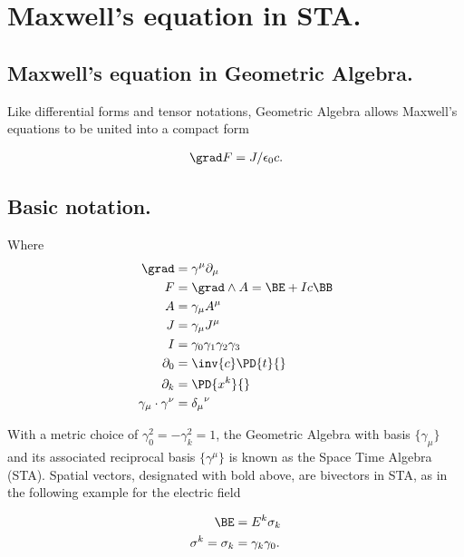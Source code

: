 
%

\chapter{Maxwell's equation in STA.}
\label{chap:maxwellsFromGA}
\date{Nov 8, 2010}

\beginArtWithToc

\section{Maxwell's equation in Geometric Algebra.}

Like differential forms and tensor notations, Geometric Algebra allows Maxwell's equations to be united into a compact form

\begin{align}\label{eqn:maxwellsFromGA:10}
\grad F = J/\epsilon_0 c.
\end{align}

\section{Basic notation.}
Where 
\begin{align}\label{eqn:maxwellsFromGA:11}
\grad &= \gamma^\mu \partial_\mu \\
F &= \grad \wedge A = \BE + I c \BB \\
A &= \gamma_\mu A^\mu \\
J &= \gamma_\mu J^\mu \\
I &= \gamma_0 \gamma_1 \gamma_2 \gamma_3 \\
\partial_0 &= \inv{c} \PD{t}{} \\
\partial_k &= \PD{x^k}{} \\
\gamma_\mu \cdot \gamma^\nu &= {\delta_\mu}^\nu 
\end{align}

With a metric choice of $\gamma_0^2 = -\gamma_k^2 = 1$, the Geometric Algebra with basis $\{\gamma_\mu\}$ and its associated reciprocal basis $\{\gamma^\mu\}$ is known as the Space Time Algebra (STA).  Spatial vectors, designated with bold above, are bivectors in STA, as in the following example for the electric field

\begin{align}\label{eqn:maxwellsFromGA:12}
\BE &= E^k \sigma_k \\
\sigma^k = \sigma_k &= \gamma_k \gamma_0.
\end{align}

